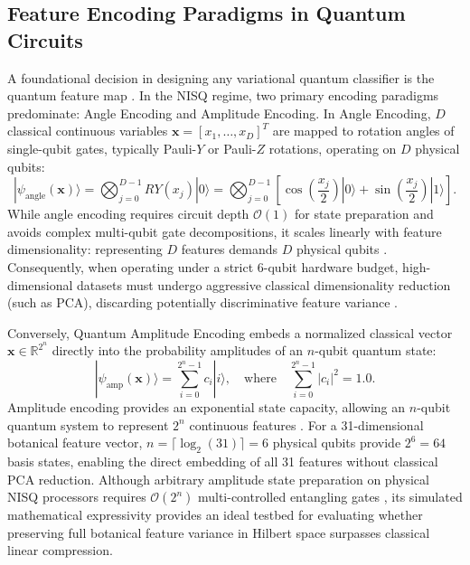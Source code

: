 \documentclass{ieeeaccess}
\begin{document}
\subsection{Feature Encoding Paradigms in Quantum Circuits}
A foundational decision in designing any variational quantum classifier is the quantum feature map \cite{schuld2021supervised, lloyd2013quantum}. In the NISQ regime, two primary encoding paradigms predominate: Angle Encoding and Amplitude Encoding. In Angle Encoding, $D$ classical continuous variables $\mathbf{x} = [x_1, \dots, x_D]^T$ are mapped to rotation angles of single-qubit gates, typically Pauli-$Y$ or Pauli-$Z$ rotations, operating on $D$ physical qubits:
\begin{equation}
    |\psi_{\text{angle}}(\mathbf{x})\rangle = \bigotimes_{j=0}^{D-1} RY(x_j)|0\rangle = \bigotimes_{j=0}^{D-1} \left[ \cos\left(\frac{x_j}{2}\right)|0\rangle + \sin\left(\frac{x_j}{2}\right)|1\rangle \right].
    \label{eq:angle_encoding}
\end{equation}
While angle encoding requires circuit depth $\mathcal{O}(1)$ for state preparation and avoids complex multi-qubit gate decompositions, it scales linearly with feature dimensionality: representing $D$ features demands $D$ physical qubits \cite{lloyd2013quantum}. Consequently, when operating under a strict 6-qubit hardware budget, high-dimensional datasets must undergo aggressive classical dimensionality reduction (such as PCA), discarding potentially discriminative feature variance \cite{bose2026progress}.

Conversely, Quantum Amplitude Encoding embeds a normalized classical vector $\mathbf{x} \in \mathbb{R}^{2^n}$ directly into the probability amplitudes of an $n$-qubit quantum state:
\begin{equation}
    |\psi_{\text{amp}}(\mathbf{x})\rangle = \sum_{i=0}^{2^n - 1} c_i |i\rangle, \quad \text{where} \quad \sum_{i=0}^{2^n - 1} |c_i|^2 = 1.0.
    \label{eq:amplitude_encoding}
\end{equation}
Amplitude encoding provides an exponential state capacity, allowing an $n$-qubit quantum system to represent $2^n$ continuous features \cite{schuld2021supervised}. For a 31-dimensional botanical feature vector, $n = \lceil \log_2(31) \rceil = 6$ physical qubits provide $2^6 = 64$ basis states, enabling the direct embedding of all 31 features without classical PCA reduction. Although arbitrary amplitude state preparation on physical NISQ processors requires $\mathcal{O}(2^n)$ multi-controlled entangling gates \cite{lloyd2013quantum}, its simulated mathematical expressivity provides an ideal testbed for evaluating whether preserving full botanical feature variance in Hilbert space surpasses classical linear compression.
\end{document}
